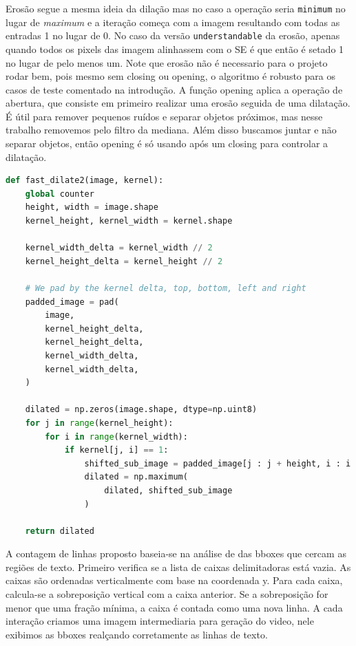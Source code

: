 \documentclass[english, 
               brazil, 
               bsc] %
               {dcomp-abntex2}
\begin{document}
Erosão segue a mesma ideia da dilação mas no caso a operação seria \texttt{minimum} no lugar de \textit{maximum} e a iteração começa com a imagem resultando com todas as entradas 1  no lugar de 0.  No caso da versão \texttt{understandable} da erosão, apenas quando todos os pixels das imagem alinhassem com o SE é que então é setado 1 no lugar de pelo menos um.  Note que erosão não é necessario para o projeto rodar bem, pois mesmo sem closing ou opening, o algoritmo é robusto para os casos de teste comentado na introdução. A função opening aplica a operação de abertura, que consiste em primeiro realizar uma erosão seguida de uma dilatação. É útil para remover pequenos ruídos e separar objetos próximos, mas nesse trabalho removemos pelo filtro da mediana. Além disso buscamos juntar e não separar objetos, então opening é só usando após um closing para controlar a dilatação.

\begin{codigo}[h]
  \caption{\small.}
 \label{fdilate2}
\begin{lstlisting}[language=python]
def fast_dilate2(image, kernel):
    global counter 
    height, width = image.shape
    kernel_height, kernel_width = kernel.shape

    kernel_width_delta = kernel_width // 2
    kernel_height_delta = kernel_height // 2

    # We pad by the kernel delta, top, bottom, left and right
    padded_image = pad(
        image,
        kernel_height_delta,
        kernel_height_delta,
        kernel_width_delta,
        kernel_width_delta,
    )

    dilated = np.zeros(image.shape, dtype=np.uint8)
    for j in range(kernel_height):
        for i in range(kernel_width):
            if kernel[j, i] == 1:
                shifted_sub_image = padded_image[j : j + height, i : i + width]
                dilated = np.maximum(
                    dilated, shifted_sub_image
                )

    return dilated
\end{lstlisting}
\end{codigo}


A contagem de linhas proposto baseia-se na análise de das bboxes que cercam as regiões de texto.
Primeiro verifica se a lista de caixas delimitadoras está vazia. As caixas são ordenadas verticalmente com base na coordenada y. Para cada caixa, calcula-se a sobreposição vertical com a caixa anterior. Se a sobreposição for menor que uma fração mínima, a caixa é contada como uma nova linha. A cada interação criamos uma imagem intermediaria para geração do video, nele exibimos as bboxes realçando corretamente as linhas de texto.
\end{document}
